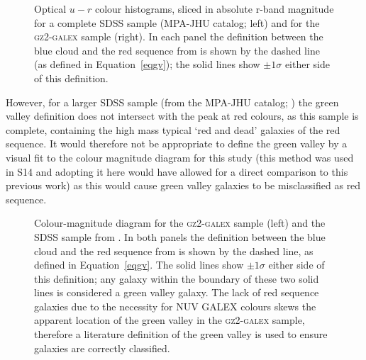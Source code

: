 \begin{figure}
\caption[Optical $u-r$ colour histograms in absolute r-band magnitude slices of the \textsc{gz2-galex} and Baldry et al. (2004) complete SDSS samples]{Optical $u-r$ colour histograms, sliced in absolute r-band magnitude for a complete SDSS sample (MPA-JHU catalog; left) and for the \textsc{gz2-galex} sample (right). In each panel the definition between the blue cloud and the red sequence from \citet{Baldry04} is shown by the dashed line (as defined in Equation~\ref{eqgv}); the solid lines show $\pm 1\sigma$ either side of this definition.}
\label{fig:cmgvsplit}
\end{figure}

However, for a larger SDSS sample (from the MPA-JHU catalog; \citealt[][left panels of Figure~\ref{fig:cmgvsplit}]{kauffmann03, brinchmann04}) the \citet{Baldry04} green valley definition does not intersect with the peak at red colours, as this sample is complete, containing the high mass typical `red and dead' galaxies of the red sequence. It would therefore not be appropriate to define the green valley by a visual fit to the colour magnitude diagram for this study (this method was used in S14 and adopting it here would have allowed for a direct comparison to this previous work) as this would cause green valley galaxies to be misclassified as red sequence.

\begin{figure}
\caption[Colour-magnitude diagram showing the location of the Baldry et al. (2004) green valley definition]{Colour-magnitude diagram for the \textsc{gz2-galex} sample (left) and the SDSS sample from \citet[][right]{Baldry04}. In both panels the definition between the blue cloud and the red sequence from \citet{Baldry04} is shown by the dashed line, as defined in Equation~\ref{eqgv}. The solid lines show $\pm 1\sigma$ either side of this definition; any galaxy within the boundary of these two solid lines is considered a green valley galaxy. The lack of red sequence galaxies due to the necessity for NUV GALEX colours skews the apparent location of the green valley in the \textsc{gz2-galex} sample, therefore a literature definition of the green valley is used to ensure galaxies are correctly classified.}
\label{fig:CMGV}
\end{figure}

